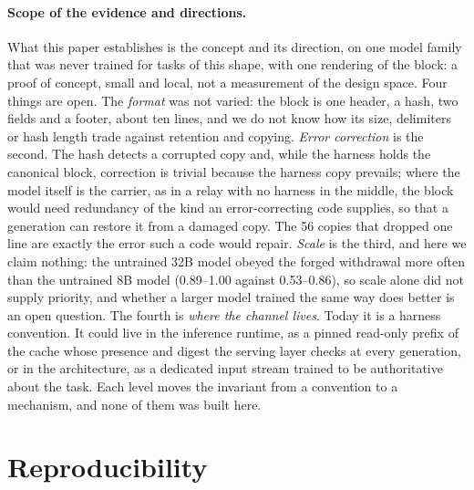\documentclass[11pt]{article}
\begin{document}
\paragraph{Scope of the evidence and directions.} What this paper establishes is the concept and its direction, on one model family that was never trained for tasks of this shape, with one rendering of the block: a proof of concept, small and local, not a measurement of the design space. Four things are open. The \emph{format} was not varied: the block is one header, a hash, two fields and a footer, about ten lines, and we do not know how its size, delimiters or hash length trade against retention and copying. \emph{Error correction} is the second. The hash detects a corrupted copy and, while the harness holds the canonical block, correction is trivial because the harness copy prevails; where the model itself is the carrier, as in a relay with no harness in the middle, the block would need redundancy of the kind an error-correcting code supplies, so that a generation can restore it from a damaged copy. The 56 copies that dropped one line are exactly the error such a code would repair. \emph{Scale} is the third, and here we claim nothing: the untrained 32B model obeyed the forged withdrawal more often than the untrained 8B model (0.89--1.00 against 0.53--0.86), so scale alone did not supply priority, and whether a larger model trained the same way does better is an open question. The fourth is \emph{where the channel lives}. Today it is a harness convention. It could live in the inference runtime, as a pinned read-only prefix of the cache whose presence and digest the serving layer checks at every generation, or in the architecture, as a dedicated input stream trained to be authoritative about the task. Each level moves the invariant from a convention to a mechanism, and none of them was built here.

\section{Reproducibility}\label{sec:repro}
\end{document}
